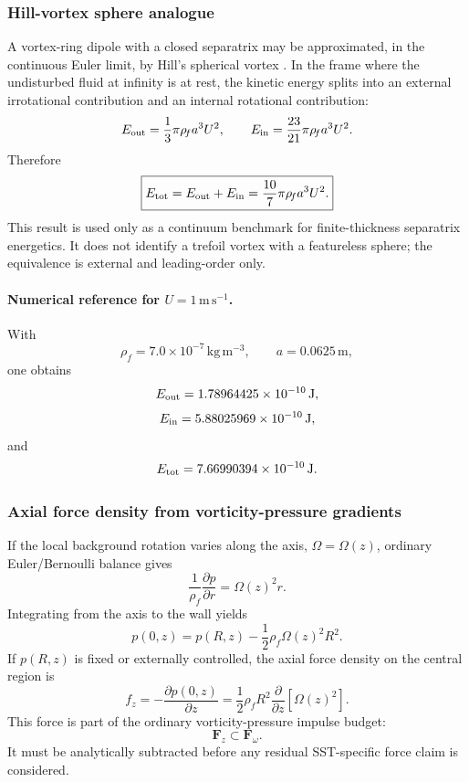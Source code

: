 \subsubsection{Hill-vortex sphere analogue}

A vortex-ring dipole with a closed separatrix may be approximated, in the
continuous Euler limit, by Hill's spherical vortex \cite{Hill1894}.  In the
frame where the undisturbed fluid at infinity is at rest, the kinetic energy
splits into an external irrotational contribution and an internal rotational
contribution:
\[
E_{\rm out}=\frac{1}{3}\pi\rho_{\!f}a^3U^2,
\qquad
E_{\rm in}=\frac{23}{21}\pi\rho_{\!f}a^3U^2.
\]
Therefore
\[
\boxed{
E_{\rm tot}=E_{\rm out}+E_{\rm in}
=\frac{10}{7}\pi\rho_{\!f}a^3U^2.
}
\]
This result is used only as a continuum benchmark for finite-thickness
separatrix energetics.  It does not identify a trefoil vortex with a
featureless sphere; the equivalence is external and leading-order only.

\paragraph{Numerical reference for \(U=1\,\mathrm{m\,s^{-1}}\).}
With
\[
\rho_{\!f}=7.0\times10^{-7}\,\mathrm{kg\,m^{-3}},
\qquad
a=0.0625\,\mathrm m,
\]
one obtains
\[
E_{\rm out}=1.78964425\times10^{-10}\,\mathrm J,
\]
\[
E_{\rm in}=5.88025969\times10^{-10}\,\mathrm J,
\]
and
\[
E_{\rm tot}=7.66990394\times10^{-10}\,\mathrm J.
\]

\subsubsection{Axial force density from vorticity-pressure gradients}

If the local background rotation varies along the axis, \(\Omega=\Omega(z)\),
ordinary Euler/Bernoulli balance gives
\[
\frac{1}{\rho_{\!f}}\frac{\partial p}{\partial r}
=\Omega(z)^2r.
\]
Integrating from the axis to the wall yields
\[
p(0,z)=p(R,z)-\frac{1}{2}\rho_{\!f}\Omega(z)^2R^2.
\]
If \(p(R,z)\) is fixed or externally controlled, the axial force density on the
central region is
\[
\boxed{
f_z=-\frac{\partial p(0,z)}{\partial z}
=\frac{1}{2}\rho_{\!f}R^2
\frac{\partial}{\partial z}\left[\Omega(z)^2\right].
}
\]
This force is part of the ordinary vorticity-pressure impulse budget:
\[
\boxed{
\mathbf F_z\subset\mathbf F_{\omega}.
}
\]
It must be analytically subtracted before any residual SST-specific force claim
is considered.

